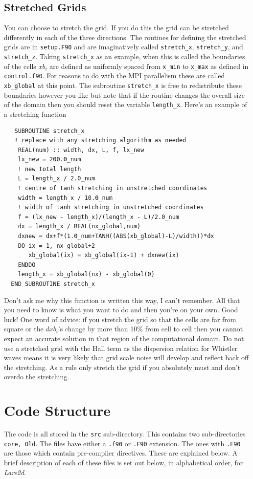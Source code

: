 \documentclass[11pt]{article}
\begin{document}
\subsection{Stretched Grids}
You can choose to stretch the grid. If you do this the grid can be stretched differently in each of the three directions. 
The routines for defining the stretched grids are in \texttt{setup.F90} and are imaginatively called 
\texttt{stretch\_x}, \texttt{stretch\_y}, and \texttt{stretch\_z}. Taking \texttt{stretch\_x} as an example, when this 
is called the boundaries of the cells
$xb_i$ are defined as uniformly spaced from \texttt{x\_min} to \texttt{x\_max} as defined in \texttt{control.f90}. 
For reasons to do with the MPI parallelism these are called \texttt{xb\_global} at this point. The subroutine 
\texttt{stretch\_x} is free to redistribute these boundaries however you like but note that if the routine changes 
the overall size of the domain then you should reset the variable \texttt{length\_x}. Here's an example of a stretching function
\begin{verbatim}
   SUBROUTINE stretch_x
   ! replace with any stretching algorithm as needed
    REAL(num) :: width, dx, L, f, lx_new
    lx_new = 200.0_num
    ! new total length
    L = length_x / 2.0_num
    ! centre of tanh stretching in unstretched coordinates
    width = length_x / 10.0_num
    ! width of tanh stretching in unstretched coordinates
    f = (lx_new - length_x)/(length_x - L)/2.0_num
    dx = length_x / REAL(nx_global,num)
    dxnew = dx+f*(1.0_num+TANH((ABS(xb_global)-L)/width))*dx
    DO ix = 1, nx_global+2
       xb_global(ix) = xb_global(ix-1) + dxnew(ix)
    ENDDO
    length_x = xb_global(nx) - xb_global(0)
  END SUBROUTINE stretch_x
\end{verbatim}
Don't ask me why this function is written this way, I can't remember. All that you need to know is what you want to do 
and then you're on your own. Good luck! One word of advice: if you stretch the grid so that the cells are far from square 
or the $dxb_i$'s change by more than 10\% from cell to cell then you cannot expect an accurate solution in that region 
of the computational domain. Do not use a stretched grid with the Hall term as the dispersion relation for Whistler waves 
means it is very likely that grid scale noise will develop and reflect back off the stretching. As a rule only stretch 
the grid if you absolutely must and don't overdo the stretching.

\section{Code Structure}
The code is all stored in the \texttt{src} sub-directory. This contains two sub-directories \texttt{core, Old}. The 
files have either a \texttt{.f90} or \texttt{.F90} extension. The ones with \texttt{.F90} are those which contain 
pre-compiler directives. These are explained below. A brief description of each of these files is set out below, in 
alphabetical order, for {\it Lare2d}.
\end{document}
